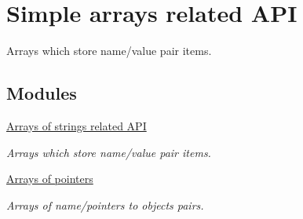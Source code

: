 \hypertarget{group__SIMPLE__ARRAYS}{
\section{Simple arrays related API}
\label{group__SIMPLE__ARRAYS}
}


Arrays which store name/value pair items.  
\subsection*{Modules}
\begin{DoxyCompactItemize}
\item 
\hyperlink{group__STR__ARRAYS}{Arrays of strings related API}


\begin{DoxyCompactList}\small\item\em Arrays which store name/value pair items. \item\end{DoxyCompactList}\item 
\hyperlink{group__PTR__ARRAYS}{Arrays of pointers}


\begin{DoxyCompactList}\small\item\em Arrays of name/pointers to objects pairs. \item\end{DoxyCompactList}\end{DoxyCompactItemize}
